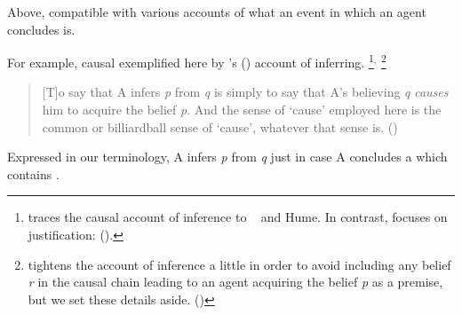 \begin{note}
  Above, compatible with various accounts of what an event in which an agent concludes is.

  For example, causal exemplified here by \citeauthor{Armstrong:1968vh}'s (\citeyear{Armstrong:1968vh}) account of inferring.%
  \footnote{
    \citeauthor{Armstrong:1968vh} traces the causal account of inference to ~\citeauthor{Moore:1962up} and Hume.
    In contrast, \citeauthor{Frege:1979aa} focuses on justification:  (\citeyear{Frege:1979aa}).
  }\(^{,}\)%
  \footnote{
    \citeauthor{Armstrong:1968vh} tightens the account of inference a little in order to avoid including any belief \emph{r} in the causal chain leading to an agent acquiring the belief \emph{p} as a premise, but we set these details aside.
    (\citeyear[195--197]{Armstrong:1968vh})
  }
  \begin{quote}
    [T]o say that A infers \emph{p} from \emph{q} is simply to say that A's believing \emph{q} \emph{causes} him to acquire the belief \emph{p}.
    And the sense of `cause' employed here is the common or billiardball sense of `cause', whatever that sense is.\newline
    \mbox{}\hfill\mbox{(\citeyear[194]{Armstrong:1968vh})}
  \end{quote}
  Expressed in our terminology, A infers \emph{p} from \emph{q} just in case A concludes  a \pool{} which contains .
\end{note}


